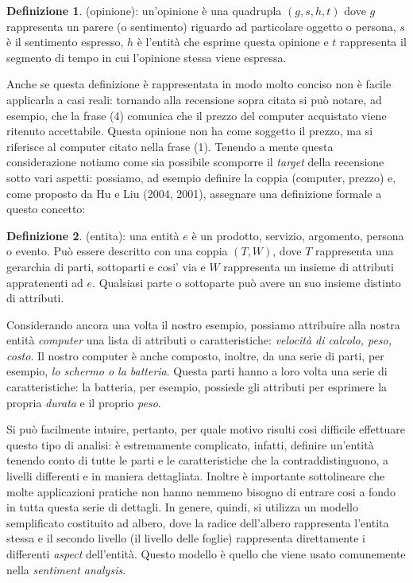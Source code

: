 \documentclass[a4paper,12pt,openright,twoside]{report}
\theoremstyle{definition}
\newtheorem{defi}{Definizione}[section]
\begin{document}
\begin{defi}(opinione): un'opinione è una quadrupla $(g, s, h, t)$ dove $g$ rappresenta un parere
(o sentimento) riguardo ad particolare oggetto o persona, $s$ è il sentimento espresso,
$h$ è l'entità che esprime questa opinione e $t$ rappresenta il segmento  di tempo in cui
l'opinione stessa viene espressa.
\end{defi}

Anche se questa definizione è rappresentata in modo molto conciso non è facile applicarla
a casi reali: tornando alla recensione sopra citata si può notare, ad esempio, che
la frase (4) comunica che il prezzo del computer acquistato viene ritenuto 
accettabile. Questa opinione non ha come soggetto il prezzo, ma si riferisce al computer
citato nella frase (1). Tenendo a mente questa considerazione notiamo come
sia possibile scomporre il \emph{target} della recensione sotto vari aspetti: possiamo, ad esempio
definire la coppia (computer, prezzo) e, come proposto da Hu e Liu (2004, 2001), %
assegnare una definizione formale a questo concetto:

\begin{defi}(entita): una entità $e$ è un prodotto, servizio, argomento, persona o evento.
Può essere descritto con una coppia $(T,W)$, dove $T$ rappresenta una gerarchia di parti, sottoparti 
e cosi' via e $W$ rappresenta un insieme di attributi appratenenti ad $e$. Qualsiasi parte o sottoparte può
avere un suo insieme distinto di attributi.
\end{defi}

Considerando ancora una volta il nostro esempio, possiamo attribuire alla nostra entità \emph{computer}
una lista di attributi o caratteristiche: \emph{velocità di calcolo, peso, costo}. Il nostro computer è anche composto,
inoltre, da una serie di parti, per esempio, \emph{lo schermo o la batteria}. Questa parti hanno a loro volta
una serie di caratteristiche: la batteria, per esempio, possiede gli attributi per esprimere la 
propria \emph{durata} e il proprio \emph{peso}.

Si può facilmente intuire, pertanto, per quale motivo risulti cosi difficile effettuare questo tipo di analisi:
è estremamente complicato, infatti, definire un’entità tenendo conto di tutte le parti e le caratteristiche che la contraddistinguono, a livelli differenti e in  maniera dettagliata.
Inoltre è importante sottolineare che molte applicazioni pratiche non hanno nemmeno bisogno di entrare cosi
a fondo in tutta questa serie di dettagli.
In genere, quindi, si utilizza un modello semplificato costituito ad albero, dove la radice dell'albero 
rappresenta l'entita stessa
e il secondo livello (il livello delle foglie) rappresenta direttamente i differenti \emph{aspect} dell'entità.
Questo modello è quello che viene usato comunemente nella \emph{sentiment analysis}.
\end{document}
